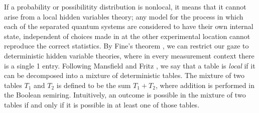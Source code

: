 \documentclass[reprint]{revtex4-1}
\theoremstyle{definition}
\begin{document}
If a probability or possibilitity distribution is nonlocal, it means that it cannot arise from a local hidden variables theory; any model for the process in which each of the separated quantum systems are considered to have their own internal state, independent of choices made in at the other experimental location cannot reproduce the correct statistics. By Fine's theorem \cite{Fine1982}, we can restrict our gaze to deterministic hidden variable theories, where in every measurement context there is a single 1 entry. Following Mansfield and Fritz \cite{Mans2011}, we say that a table is \emph{local} if it can be decomposed into a mixture of deterministic tables. The mixture of two tables $T_1$ and $T_2$ is defined to be the sum $T_1+T_2$, where addition is performed in the Boolean semiring. Intuitively, an outcome is possible in the mixture of two tables if and only if it is possible in at least one of those tables.
\end{document}
